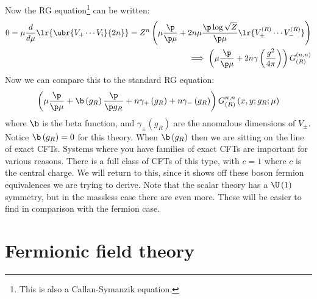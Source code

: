 \documentclass{booc}
\begin{document}
Now the RG equation\footnote{
This is also a Callan-Symanzik equation.}
can be written:
\begin{eqnarray}
0 = \mu \frac{d}{d\mu}\lr{\ubr{V_+ \cdots V_i}{2n}}
= Z^n\left( 
\mu \frac{\p}{\p\mu} + 2n\mu
\frac{\p \log\sqrt{Z}}{\p\mu} \lr{V_+^{\left( R \right)} \cdots V_-^{\left( R \right)}}
\right)
\\ \implies
\left( \mu \frac{\p}{\p\mu} + 2n \gamma \left( \frac{g^2}{4\pi} \right) \right)
G_{\left( R \right)}^{\left( n,n \right)}
\end{eqnarray}
Now we can compare this to the standard RG equation:
\begin{equation}
\left( \mu \frac{\p}{\p\mu} + 
\b\left( g_R \right)
\frac{\p}{\p g_R} + 
n \gamma_+ \left( g_R \right) + 
n\gamma_- \left( g_R \right)
\right)
G_{\left( R \right)}^{n,n}
\left( x  ,y ; g_R ;\mu \right)
\end{equation}
where $\b$ is the beta function, and $\gamma_{\pm}\left( g_R \right)$ 
are the anomalous dimensions of $V_{\pm}$.
Notice $\b\left( g_R \right) = 0$ for this theory.
When $\b\left( g_R \right)$ then we are sitting on the line of exact CFTs.
Systems where you have families of exact CFTs are important for various reasons.
There is a full class of CFTs of this type, with $c = 1$
where $c$ is the central charge.
We will return to this, since it shows off these boson fermion equivalences we are trying to derive.
Note that the scalar theory has a $\U\left( 1 \right)$ symmetry, 
but in the massless case there are even more. 
These will be easier to find in comparison with the fermion case.

\section{Fermionic field theory}
\end{document}
